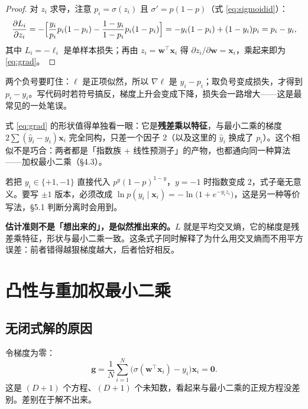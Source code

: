 \documentclass[11pt,a4paper,fontset=windows,zihao=-4]{ctexart}
\newcommand{\bw}{\mathbf{w}}
\newcommand{\bx}{\mathbf{x}}
\newcommand{\bg}{\mathbf{g}}
\newcommand{\bzero}{\mathbf{0}}
\newcommand{\tp}{^{\top}}
\begin{document}
\begin{proof}
对 $z_i$ 求导，注意 $p_i=\sigma(z_i)$ 且 $\sigma'=p(1-p)$（式 \eqref{eq:sigmoidid}）：
\[
  \frac{\partial L_i}{\partial z_i}
  =-\Bigl[\frac{y_i}{p_i}p_i(1-p_i)-\frac{1-y_i}{1-p_i}p_i(1-p_i)\Bigr]
  =-y_i(1-p_i)+(1-y_i)p_i
  =p_i-y_i ,
\]
其中 $L_i=-\ell_i$ 是单样本损失；再由 $z_i=\bw\tp\bx_i$ 得 $\partial z_i/\partial\bw=\bx_i$，乘起来即为 \eqref{eq:grad}。
\end{proof}

两个负号要盯住：$\ell$ 是正项似然，所以 $\nabla\ell$ 是 $y_i-p_i$；取负号变成损失，才得到 $p_i-y_i$。写代码时若符号搞反，梯度上升会变成下降，损失会一路增大——这是最常见的一处笔误。

式 \eqref{eq:grad} 的形状值得单独看一眼：它是\textbf{残差乘以特征}，与最小二乘的梯度 $2\sum(\hat y_i-y_i)\bx_i$ 完全同构，只差一个因子 $2$（以及这里的 $\hat y_i$ 换成了 $p_i$）。这个相似不是巧合：两者都是「指数族 + 线性预测子」的产物，也都通向同一种算法——加权最小二乘（\S4.3）。

\begin{warn}[$\pm1$ 标签代进似然会失效]
若把 $y_i\in\{+1,-1\}$ 直接代入 $p^{y}(1-p)^{1-y}$，$y=-1$ 时指数变成 $2$，式子毫无意义。要写 $\pm1$ 版本，必须改成 $\ln p(y_i\mid\bx_i)=-\ln\bigl(1+e^{-y_i z_i}\bigr)$，这是另一种等价写法，\S5.1 判断分离时会用到。
\end{warn}

\begin{keybox}[本节结论]
\textbf{估计准则不是「想出来的」，是似然推出来的。}$L$ 就是平均交叉熵，它的梯度是残差乘特征，形状与最小二乘一致。这条式子同时解释了为什么用交叉熵而不用平方误差：前者错得越狠梯度越大，后者恰好相反。
\end{keybox}


\section{凸性与重加权最小二乘}

\subsection{无闭式解的原因}

令梯度为零：
\begin{equation}
  \bg=\frac1N\sum_{i=1}^{N}\bigl(\sigma(\bw\tp\bx_i)-y_i\bigr)\bx_i=\bzero .
  \label{eq:firstorder}
\end{equation}
这是 $(D+1)$ 个方程、$(D+1)$ 个未知数，看起来与最小二乘的正规方程没差别。差别在于解不出来。
\end{document}
